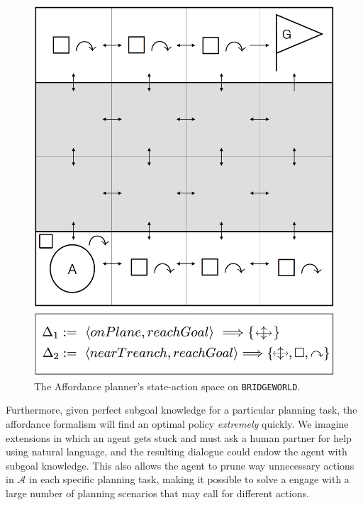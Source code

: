 \documentclass[]{article}
\begin{document}
\begin{figure}
\centering
\includegraphics[scale=0.22]{figures/bridgeworld_aff.png}
\caption{The Affordance planner's state-action space on \texttt{BRIDGEWORLD}.}
\label{fig:bridgeworld_aff}
\end{figure}

Furthermore, given perfect subgoal knowledge for a
particular planning task, the affordance formalism will find an
optimal policy {\it extremely} quickly. We imagine extensions in which
an agent gets stuck and must ask a human partner for help using
natural language, and the resulting dialogue could endow the agent
with subgoal knowledge. This also allows the agent to prune way
unnecessary actions in $\mathcal{A}$ in each specific planning task,
making it possible to solve a engage with a large number of planning
scenarios that may call for different actions. 
\end{document}
